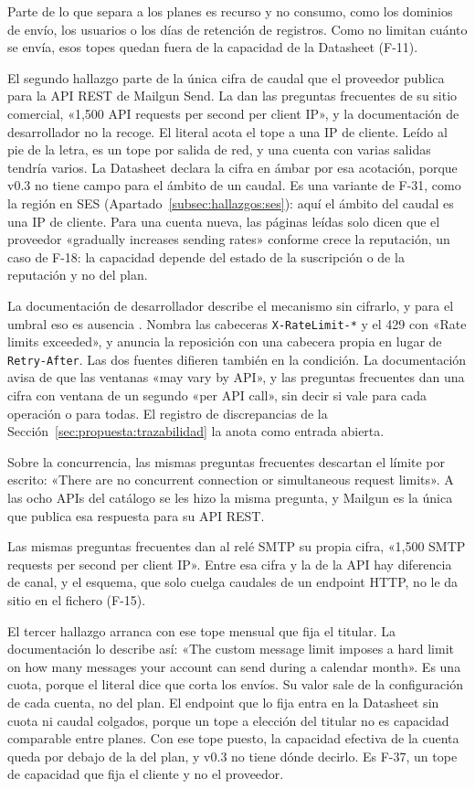 Parte de lo que separa a los planes es recurso y no consumo, como los dominios
de envío, los usuarios o los días de retención de registros.
Como no limitan cuánto se envía, esos topes quedan fuera de la capacidad de la
Datasheet (F-11).

El segundo hallazgo parte de la única cifra de caudal que el proveedor publica
para la API REST de Mailgun Send. La dan las preguntas frecuentes de su sitio
comercial, «1,500 API requests per second per client IP», y la documentación de
desarrollador no la recoge. El literal acota el tope a una IP de cliente. Leído al pie de la
letra, es un tope por salida de red, y una cuenta con varias salidas tendría
varios. La Datasheet declara la cifra en ámbar por esa acotación, porque v0.3 no tiene campo para el ámbito de un caudal. Es una variante de F-31, como la región en SES (Apartado~\ref{subsec:hallazgos:ses}): aquí el ámbito del caudal es una IP de cliente. Para una cuenta nueva, las páginas leídas solo
dicen que el proveedor «gradually increases sending rates» conforme crece la
reputación, un caso de F-18: la capacidad depende del estado de la suscripción o de la reputación y no
del plan.

La documentación de desarrollador describe el mecanismo sin cifrarlo, y para el
umbral eso es ausencia \citep{mailgundocs}. Nombra las cabeceras
\texttt{X-RateLimit-*} y el 429 con «Rate limits exceeded», y anuncia la
reposición con una cabecera propia en lugar de \texttt{Retry-After}. Las dos fuentes difieren también en la condición. La documentación avisa de que las
ventanas «may vary by API», y las preguntas frecuentes dan una cifra con ventana
de un segundo «per API call», sin decir si vale para cada operación o para
todas. El registro de discrepancias de la Sección~\ref{sec:propuesta:trazabilidad} la anota como entrada abierta.

Sobre la concurrencia, las mismas preguntas frecuentes descartan el límite por
escrito: «There are no concurrent connection or simultaneous request limits».
A las ocho APIs del catálogo se les hizo la misma pregunta, y Mailgun es la única
que publica esa respuesta para su API REST.

Las mismas preguntas frecuentes dan al relé SMTP su propia cifra, «1,500 SMTP requests per second per client IP». Entre esa cifra y la de la API hay diferencia de canal, y el esquema, que solo cuelga caudales de un endpoint HTTP, no le da sitio en el fichero (F-15).

El tercer hallazgo arranca con ese tope mensual que fija el titular. La
documentación lo describe así: «The custom message limit imposes a hard limit on
how many messages your account can send during a calendar month». Es una cuota,
porque el literal dice que corta los envíos. Su valor sale de la
configuración de cada cuenta, no del plan. El endpoint que lo fija entra en
la Datasheet sin cuota ni caudal colgados, porque un tope a elección del titular no es
capacidad comparable entre planes. Con ese tope puesto, la capacidad efectiva de la cuenta
queda por debajo de la del plan, y v0.3 no tiene dónde decirlo. Es F-37, un tope
de capacidad que fija el cliente y no el proveedor.

